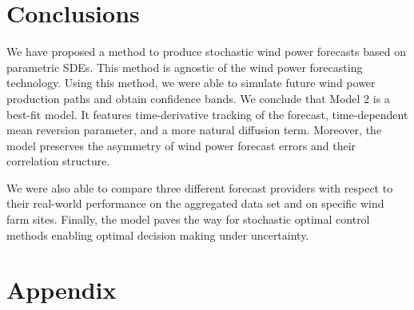 \documentclass[11pt]{article}
\theoremstyle{definition}
\begin{document}

\section{Conclusions} \label{Section_7}

We have proposed a method to produce stochastic wind power forecasts based on parametric SDEs. This method is agnostic of the wind power forecasting technology. Using this method, we were able to simulate future wind power production paths and obtain confidence bands. We conclude that Model 2 is a best-fit model. It features time-derivative tracking of the forecast, time-dependent mean reversion parameter, and a more natural diffusion term. Moreover, the model preserves the asymmetry of wind power forecast errors and their correlation structure.

We were also able to compare three different forecast providers with respect to their real-world performance on the aggregated data set and on specific wind farm sites. Finally, the model paves the way for stochastic optimal control methods enabling optimal decision making under uncertainty.



\section{Appendix} \label{Appendix}
\end{document}
